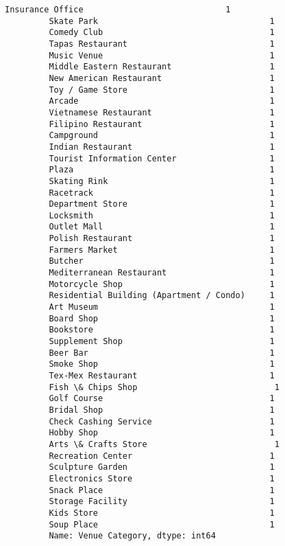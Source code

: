 \documentclass[11pt]{article}
\begin{document}
\begin{Verbatim}[commandchars=\\\{\}]
         Insurance Office                             1
         Skate Park                                   1
         Comedy Club                                  1
         Tapas Restaurant                             1
         Music Venue                                  1
         Middle Eastern Restaurant                    1
         New American Restaurant                      1
         Toy / Game Store                             1
         Arcade                                       1
         Vietnamese Restaurant                        1
         Filipino Restaurant                          1
         Campground                                   1
         Indian Restaurant                            1
         Tourist Information Center                   1
         Plaza                                        1
         Skating Rink                                 1
         Racetrack                                    1
         Department Store                             1
         Locksmith                                    1
         Outlet Mall                                  1
         Polish Restaurant                            1
         Farmers Market                               1
         Butcher                                      1
         Mediterranean Restaurant                     1
         Motorcycle Shop                              1
         Residential Building (Apartment / Condo)     1
         Art Museum                                   1
         Board Shop                                   1
         Bookstore                                    1
         Supplement Shop                              1
         Beer Bar                                     1
         Smoke Shop                                   1
         Tex-Mex Restaurant                           1
         Fish \& Chips Shop                            1
         Golf Course                                  1
         Bridal Shop                                  1
         Check Cashing Service                        1
         Hobby Shop                                   1
         Arts \& Crafts Store                          1
         Recreation Center                            1
         Sculpture Garden                             1
         Electronics Store                            1
         Snack Place                                  1
         Storage Facility                             1
         Kids Store                                   1
         Soup Place                                   1
         Name: Venue Category, dtype: int64
\end{Verbatim}
            
\end{document}
